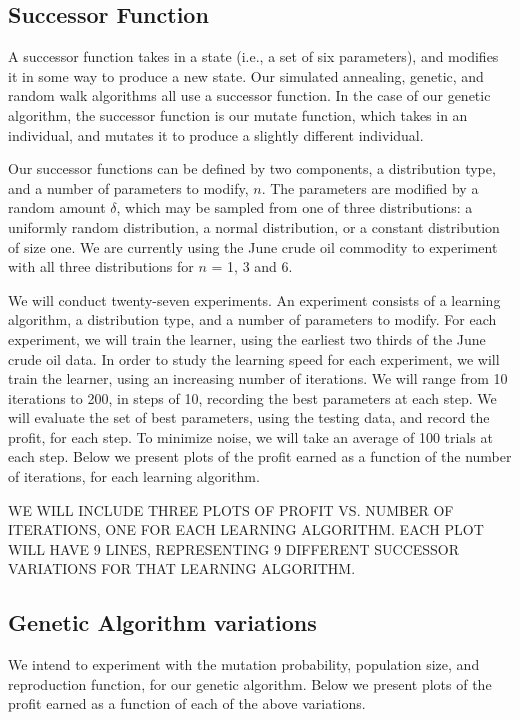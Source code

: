 \documentclass[12pt]{article}
\begin{document}
\subsection{Successor Function}

A successor function takes in a state (i.e., a set of six parameters), and
modifies it in some way to produce a new state.  Our simulated annealing,
genetic, and random walk algorithms all use a successor function.  In the case
of our genetic algorithm, the successor function is our mutate function, which
takes in an individual, and mutates it to produce a slightly different
individual.

Our successor functions can be defined by two components, a distribution type,
and a number of parameters to modify, $n$. The parameters are modified by a
random amount $\delta$, which may be sampled from one of three distributions: a
uniformly random distribution, a normal distribution, or a constant distribution
of size one. We are currently using the June crude oil commodity to experiment
with all three distributions for $n$ = 1, 3 and 6.


We will conduct twenty-seven experiments. An experiment consists of a learning
algorithm, a distribution type, and a number of parameters to modify. For each
experiment, we will train the learner, using the earliest two thirds of the June
crude oil data. In order to study the learning speed for each experiment, we
will train the learner, using an increasing number of iterations. We will range
from 10 iterations to 200, in steps of 10, recording the best parameters at each
step. We will evaluate the set of best parameters, using the testing data, and
record the profit, for each step. To minimize noise, we will take an average of
100 trials at each step. Below we present plots of the profit earned as a
function of the number of iterations, for each learning algorithm.


WE WILL INCLUDE THREE PLOTS OF PROFIT VS. NUMBER OF ITERATIONS, ONE FOR EACH
LEARNING ALGORITHM. EACH PLOT WILL HAVE 9 LINES, REPRESENTING 9 DIFFERENT
SUCCESSOR VARIATIONS FOR THAT LEARNING ALGORITHM.


\subsection{Genetic Algorithm variations}

We intend to experiment with the mutation probability, population size, and
reproduction function, for our genetic algorithm. Below we present plots of the
profit earned as a function of each of the above variations.
\end{document}
